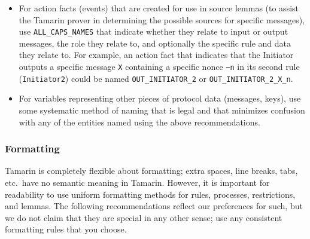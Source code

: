\begin{itemize}
\item For action facts (events) that are created for use in source lemmas (to assist the Tamarin prover in determining the possible sources for specific messages), use \texttt{ALL\_CAPS\_NAMES} that indicate whether they relate to input or output messages, the role they relate to, and optionally the specific rule and data they relate to. For example, an action fact that indicates that the Initiator outputs a specific message \texttt{X} containing a specific nonce \texttt{\textasciitilde{}n} in its second rule (\texttt{Initiator2}) could be named \texttt{OUT\_INITIATOR\_2} or \texttt{OUT\_INITIATOR\_2\_X\_n}.

\item For variables representing other pieces of protocol data (messages, keys), use some systematic method of naming that is legal and that minimizes confusion with any of the entities named using the above recommendations.

\end{itemize}

\subsubsection{Formatting}

Tamarin is completely flexible about formatting; extra spaces, line breaks, tabs, etc.~have no semantic meaning in Tamarin. However, it is important for readability to use uniform formatting methods for rules, processes, restrictions, and lemmas. The following recommendations reflect our preferences for such, but we do not claim that they are special in any other sense; use any consistent formatting rules that you choose.


